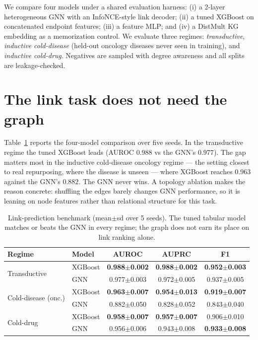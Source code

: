\documentclass[11pt]{article}
\begin{document}
We compare four models under a shared evaluation harness: (i) a 2-layer heterogeneous GNN
with an InfoNCE-style link decoder; (ii) a tuned XGBoost on concatenated endpoint features;
(iii) a feature MLP; and (iv) a DistMult KG embedding as a memorization control. We evaluate
three regimes: \emph{transductive}, \emph{inductive cold-disease} (held-out oncology diseases
never seen in training), and \emph{inductive cold-drug}. Negatives are sampled with degree
awareness and all splits are leakage-checked.

\section{The link task does not need the graph}\label{sec:link}
Table~\ref{tab:bench} reports the four-model comparison over five seeds. In the transductive
regime the tuned XGBoost leads (AUROC $0.988$ vs the GNN's $0.977$). The gap matters most in
the inductive cold-disease oncology regime --- the setting closest to real repurposing,
where the disease is unseen --- where XGBoost reaches $0.963$ against the GNN's $0.882$. The
GNN never wins. A topology ablation makes the reason concrete: shuffling the edges barely
changes GNN performance, so it is leaning on node features rather than relational structure
for this task.

\begin{table}[t]
\centering\small
\caption{Link-prediction benchmark (mean$\pm$sd over 5 seeds). The tuned tabular model
matches or beats the GNN in every regime; the graph does not earn its place on link ranking
alone.}
\label{tab:bench}
\begin{tabular}{llccc}
\toprule
\textbf{Regime} & \textbf{Model} & \textbf{AUROC} & \textbf{AUPRC} & \textbf{F1}\\
\midrule
\multirow{2}{*}{Transductive} & XGBoost & \textbf{0.988$\pm$0.002} & \textbf{0.988$\pm$0.002} & \textbf{0.952$\pm$0.003}\\
 & GNN & 0.977$\pm$0.003 & 0.972$\pm$0.005 & 0.937$\pm$0.005\\
\midrule
\multirow{2}{*}{Cold-disease (onc.)} & XGBoost & \textbf{0.963$\pm$0.007} & \textbf{0.954$\pm$0.013} & \textbf{0.919$\pm$0.007}\\
 & GNN & 0.882$\pm$0.050 & 0.828$\pm$0.052 & 0.843$\pm$0.040\\
\midrule
\multirow{2}{*}{Cold-drug} & XGBoost & \textbf{0.958$\pm$0.007} & \textbf{0.957$\pm$0.007} & 0.906$\pm$0.010\\
 & GNN & 0.956$\pm$0.006 & 0.943$\pm$0.008 & \textbf{0.933$\pm$0.008}\\
\bottomrule
\end{tabular}
\end{table}
\end{document}
